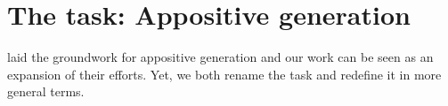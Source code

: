 \documentclass[11pt]{article}
\newcommand{\dltodo}[1]{\todo[color=yellow!20]{#1}}
\newcommand{\jttodo}[1]{\todo[color=blue!20]{#1}}
\begin{document}



\section{The task: Appositive generation}
\label{sec:appo}
 laid the groundwork for appositive generation and our work can be seen as an expansion of their efforts. Yet, we both rename the task and redefine it in more general terms. 
\end{document}
